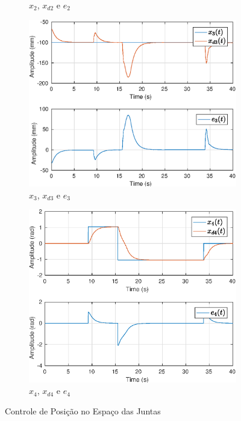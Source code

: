 \begin{figure}[H]
\begin{subfigure}{.5\textwidth}
  \caption{$x_2$, $x_{d2}$ e $e_2$}
  \label{fig:sub2}
\end{subfigure}
\begin{subfigure}{.5\textwidth}
  \centering
  \includegraphics[width=\linewidth]{./img/position/x3.eps}
  \caption{$x_3$, $x_{d3}$ e $e_3$}
  \label{fig:sub1}
\end{subfigure}%
\begin{subfigure}{.5\textwidth}
  \centering
  \includegraphics[width=\linewidth]{./img/position/x4.eps}
  \caption{$x_4$, $x_{d4}$ e $e_4$}
  \label{fig:sub2}
\end{subfigure}
\caption{Controle de Posição no Espaço das Juntas}
\label{fig:test}
\end{figure}


